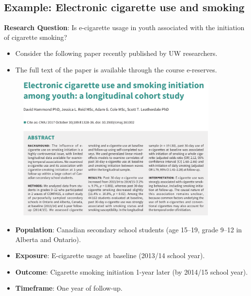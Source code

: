 \subsection*{Example: Electronic cigarette use and smoking}
\begin{Example}{}
    \textbf{Research Question}: Is e-cigarette usage in youth associated with the initiation of
    cigarette smoking?
\end{Example}
\begin{itemize}
    \item Consider the following paper recently published by UW researchers.
    \item The full text of the paper is available through the course e-reserves.
\end{itemize}
\begin{figure}[H]
    \centering
    \includegraphics[width=0.9\textwidth]{0/1.pdf}
\end{figure}
\begin{itemize}
    \item \textbf{Population}: Canadian secondary school students (age 15--19, grade 9--12 in Alberta and Ontario).
    \item \textbf{Exposure}: E-cigarette usage at baseline (2013/14 school year).
    \item \textbf{Outcome}: Cigarette smoking initiation 1-year later (by 2014/15 school year).
    \item \textbf{Timeframe}: One year of follow-up.
\end{itemize}
